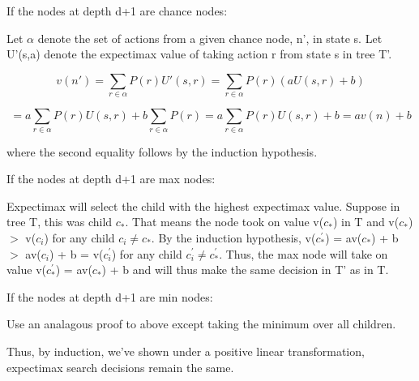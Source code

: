 \documentclass[11pt,a4paper]{article}
\begin{document}
If the nodes at depth d+1 are chance nodes:

Let $\alpha$ denote the set of actions from a given chance node, n', in state s. Let U'(s,a) denote the expectimax value of taking action r from state s in tree T'. 

$$v(n') = \sum_{r \in \alpha} P(r)U'(s,r) = \sum_{r \in \alpha} P(r)(aU(s,r) + b)$$

$$ = a \sum_{r \in \alpha} P(r)U(s,r) + b\sum_{r \in \alpha} P(r) = a \sum_{r \in \alpha} P(r)U(s,r) + b = av(n) + b$$

where the second equality follows by the induction hypothesis. 
\newline

If the nodes at depth d+1 are max nodes:

Expectimax will select the child with the highest expectimax value. Suppose in tree T, this was child $c_{*}$. That means the node took on value v($c_{*}$) in T and v($c_{*}$) $>$ v($c_{i}$) for any child $c_{i} \neq c_{*}$.  By the induction hypothesis, v($c_{*}^{'}$) = av($c_{*}$) + b $>$ av($c_{i}$) + b = v($c_{i}^{'}$) for any child $c_{i}^{'} \neq c_{*}^{'}$. Thus, the max node will take on value v($c_{*}^{'}$) = av($c_{*}$) + b and will thus make the same decision in T' as in T.
\newline

If the nodes at depth d+1 are min nodes:

Use an analagous proof to above except taking the minimum over all children. 

Thus, by induction, we've shown under a positive linear transformation, expectimax search decisions remain the same.
\end{document}

